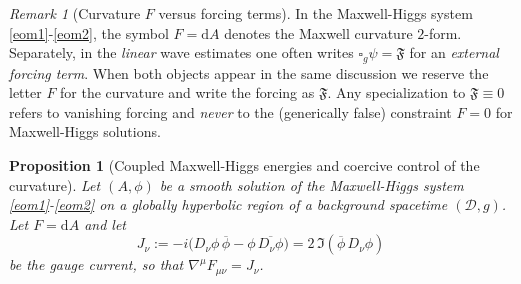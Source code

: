 \documentclass[11pt]{article}
\numberwithin{equation}{section}
\theoremstyle{plain}
\newtheorem{proposition}[theorem]{Proposition}
\theoremstyle{definition}
\theoremstyle{remark}
\newtheorem{remark}{Remark}[section]
\newcommand{\dd}{\mathrm{d}}
\begin{document}
\begin{remark}[Curvature $F$ versus forcing terms]\label{rem:MH-F-notation}
In the Maxwell-Higgs system \eqref{eom1}-\eqref{eom2}, the symbol $F=\dd A$ denotes the Maxwell curvature $2$-form.
Separately, in the \emph{linear} wave estimates one often writes $\square_{g}\psi=\mathfrak{F}$ for an \emph{external forcing term}.
When both objects appear in the same discussion we reserve the letter $F$ for the curvature and write the forcing as $\mathfrak{F}$.
Any specialization to $\mathfrak{F}\equiv0$ refers to vanishing forcing and \emph{never} to the (generically false) constraint $F=0$ for Maxwell-Higgs solutions.
\end{remark}

\begin{proposition}[Coupled Maxwell-Higgs energies and coercive control of the curvature]\label{prop:MH-energy-control-F}
Let $(A,\phi)$ be a smooth solution of the Maxwell-Higgs system \eqref{eom1}-\eqref{eom2} on a globally hyperbolic region of a background spacetime $(\mathcal D,g)$.
Let $F=\dd A$ and let
\begin{equation}\label{eq:MH-current-prop42}
J_{\nu}:=-i\bigl(D_{\nu}\phi\,\overline{\phi}-\phi\,\overline{D_{\nu}\phi}\bigr)
=2\,\Im(\overline\phi\,D_{\nu}\phi)
\end{equation}
be the gauge current, so that $\nabla^{\mu}F_{\mu\nu}=J_{\nu}$.


\end{proposition}
\end{document}
